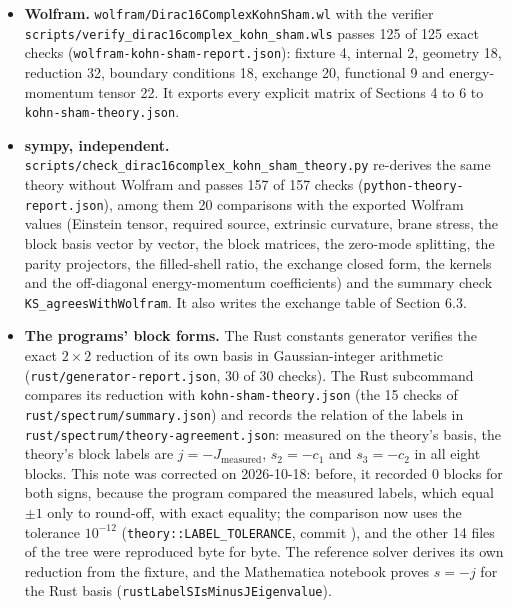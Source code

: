 \documentclass[11pt]{article}
\begin{document}
\begin{itemize}
\item \textbf{Wolfram.} \texttt{wolfram/\allowbreak{}Dirac16C\allowbreak{}omplexKo\allowbreak{}hnSham.w\allowbreak{}l} with the verifier \texttt{scripts/\allowbreak{}verify\_d\allowbreak{}irac16co\allowbreak{}mplex\_ko\allowbreak{}hn\_sham.\allowbreak{}wls} passes 125 of 125 exact checks (\texttt{wolfram-\allowbreak{}kohn-sha\allowbreak{}m-report\allowbreak{}.json}): fixture 4, internal 2, geometry 18, reduction 32, boundary conditions 18, exchange 20, functional 9 and energy-momentum tensor 22. It exports every explicit matrix of Sections 4 to 6 to \texttt{kohn-sha\allowbreak{}m-theory\allowbreak{}.json}.
\item \textbf{sympy, independent.} \texttt{scripts/\allowbreak{}check\_di\allowbreak{}rac16com\allowbreak{}plex\_koh\allowbreak{}n\_sham\_t\allowbreak{}heory.py} re-derives the same theory without Wolfram and passes 157 of 157 checks (\texttt{python-t\allowbreak{}heory-re\allowbreak{}port.jso\allowbreak{}n}), among them 20 comparisons with the exported Wolfram values (Einstein tensor, required source, extrinsic curvature, brane stress, the block basis vector by vector, the block matrices, the zero-mode splitting, the parity projectors, the filled-shell ratio, the exchange closed form, the kernels and the off-diagonal energy-momentum coefficients) and the summary check \texttt{KS\_agree\allowbreak{}sWithWol\allowbreak{}fram}. It also writes the exchange table of Section 6.3.
\item \textbf{The programs' block forms.} The Rust constants generator verifies the exact $2\times2$ reduction of its own basis in Gaussian-integer arithmetic (\texttt{rust/gen\allowbreak{}erator-r\allowbreak{}eport.js\allowbreak{}on}, 30 of 30 checks). The Rust \texttt{} subcommand compares its reduction with \texttt{kohn-sha\allowbreak{}m-theory\allowbreak{}.json} (the 15 checks \texttt{} of \texttt{rust/spe\allowbreak{}ctrum/su\allowbreak{}mmary.js\allowbreak{}on}) and records the relation of the labels in \texttt{rust/spe\allowbreak{}ctrum/th\allowbreak{}eory-agr\allowbreak{}eement.j\allowbreak{}son}: measured on the theory's basis, the theory's block labels are $j=-J_{\mathrm{measured}}$, $s_2=-c_1$ and $s_3=-c_2$ in all eight blocks. This note was corrected on 2026-10-18: before, it recorded 0 blocks for both signs, because the program compared the measured labels, which equal $\pm1$ only to round-off, with exact equality; the comparison now uses the tolerance $10^{-12}$ (\texttt{theory::\allowbreak{}LABEL\_TO\allowbreak{}LERANCE}, commit \texttt{}), and the other 14 files of the \texttt{} tree were reproduced byte for byte. The reference solver derives its own reduction from the fixture, and the Mathematica notebook proves $s=-j$ for the Rust basis (\texttt{rustLabe\allowbreak{}lSIsMinu\allowbreak{}sJEigenv\allowbreak{}alue}).
\end{itemize}
\end{document}
